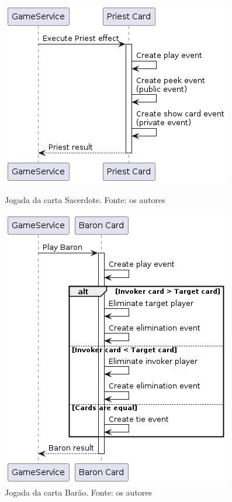 \begin{figure}[h]
    \centering
    \begin{minipage}{0.48\textwidth}
        \centering
        \includegraphics[width=\textwidth]{diagrams/PriestCardPlay.png}
        \caption{Jogada da carta Sacerdote. Fonte: os autores}
        \label{fig:priest-card-play}
    \end{minipage}
    \hfill
    \begin{minipage}{0.48\textwidth}
        \centering
        \includegraphics[width=\textwidth]{diagrams/BaronCardPlay.png}
        \caption{Jogada da carta Barão. Fonte: os autores}
        \label{fig:baron-card-play}
    \end{minipage}
\end{figure}

